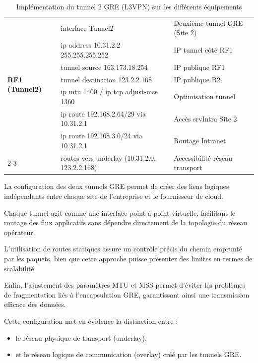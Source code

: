\documentclass[12pt,a4paper, oneside]{memoir}
\begin{document}
\begin{enumerate}
\begin{table}[H]
\begin{tabular}{|p{2.5cm}|p{7cm}|p{6.5cm}|}
		\multirow{7}{*}{\textbf{RF1 (Tunnel2)}} 
		& interface Tunnel2 & Deuxième tunnel GRE (Site 2) \\
		& ip address 10.31.2.2 255.255.255.252 & IP tunnel côté RF1 \\
		& tunnel source 163.173.18.254 & IP publique RF1 \\
		& tunnel destination 123.2.2.168 & IP publique R2 \\
		& ip mtu 1400 / ip tcp adjust-mss 1360 & Optimisation tunnel \\
		& ip route 192.168.2.64/29 via 10.31.2.1 & Accès srvIntra Site 2 \\
		& ip route 192.168.3.0/24 via 10.31.2.1 & Routage Intranet \\
		\cline{2-3}
		& routes vers underlay (10.31.2.0, 123.2.2.168) & Accessibilité réseau transport \\
		\hline
		
	\end{tabular}
	\caption{Implémentation du tunnel 2 GRE (L3VPN) sur les différents équipements}
\end{table}


La configuration des deux tunnels GRE permet de créer des liens logiques indépendants entre chaque site de l’entreprise et le fournisseur de cloud.

Chaque tunnel agit comme une interface point-à-point virtuelle, facilitant le routage des flux applicatifs sans dépendre directement de la topologie du réseau opérateur.

L’utilisation de routes statiques assure un contrôle précis du chemin emprunté par les paquets, bien que cette approche puisse présenter des limites en termes de scalabilité.

Enfin, l’ajustement des paramètres MTU et MSS permet d’éviter les problèmes de fragmentation liés à l’encapsulation GRE, garantissant ainsi une transmission efficace des données.

Cette configuration met en évidence la distinction entre :
\begin{itemize}
	\item le réseau physique de transport (underlay),
	\item et le réseau logique de communication (overlay) créé par les tunnels GRE.
\end{itemize}


\end{enumerate}
\end{document}
